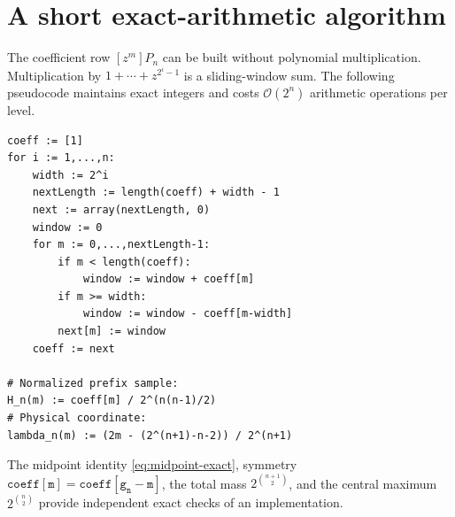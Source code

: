 \documentclass[11pt,oneside]{article}
\theoremstyle{definition}
\theoremstyle{remark}
\newcommand{\bigO}{\mathcal O}
\begin{document}
\section{A short exact-arithmetic algorithm}
\label{app:algorithm}

The coefficient row $[z^m]P_n$ can be built without polynomial multiplication.  Multiplication
by $1+\cdots+z^{2^i-1}$ is a sliding-window sum.  The following pseudocode maintains exact
integers and costs $\bigO(2^n)$ arithmetic operations per level.

\begin{lstlisting}[style=pseudo]
coeff := [1]
for i := 1,...,n:
    width := 2^i
    nextLength := length(coeff) + width - 1
    next := array(nextLength, 0)
    window := 0
    for m := 0,...,nextLength-1:
        if m < length(coeff):
            window := window + coeff[m]
        if m >= width:
            window := window - coeff[m-width]
        next[m] := window
    coeff := next

# Normalized prefix sample:
H_n(m) := coeff[m] / 2^(n(n-1)/2)
# Physical coordinate:
lambda_n(m) := (2m - (2^(n+1)-n-2)) / 2^(n+1)
\end{lstlisting}

The midpoint identity \eqref{eq:midpoint-exact}, symmetry
$\mathtt{coeff[m]}=\mathtt{coeff[g_n-m]}$, the total mass
$2^{\binom{n+1}{2}}$, and the central maximum $2^{\binom n2}$ provide independent exact
checks of an implementation.
\end{document}
